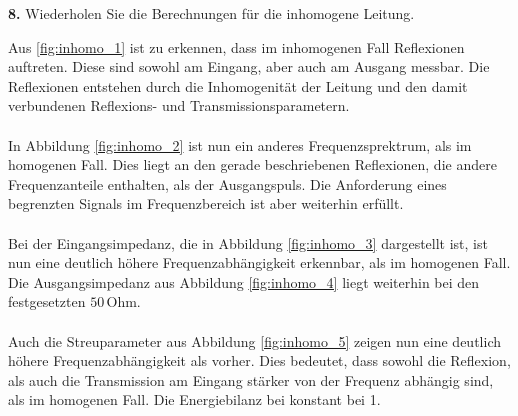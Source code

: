 \documentclass[Protokollheft.tex]{subfiles}
\begin{document}
\begin{framed}
	\noindent \textbf{8.} Wiederholen Sie die Berechnungen für die inhomogene Leitung.\label{exer:calc4inhomTLine}
\end{framed}
\noindent
Aus \ref{fig:inhomo_1} ist zu erkennen, dass im inhomogenen Fall Reflexionen auftreten. Diese sind sowohl am Eingang, aber auch am Ausgang messbar. Die Reflexionen entstehen durch die Inhomogenität der Leitung und den damit verbundenen Reflexions- und Transmissionsparametern.\\
\\
In Abbildung \ref{fig:inhomo_2} ist nun ein anderes Frequenzsprektrum, als im homogenen Fall. Dies liegt an den gerade beschriebenen Reflexionen, die andere Frequenzanteile enthalten, als der Ausgangspuls. Die Anforderung eines begrenzten Signals im Frequenzbereich ist aber weiterhin erfüllt.\\
\\
Bei der Eingangsimpedanz, die in Abbildung \ref{fig:inhomo_3} dargestellt ist, ist nun eine deutlich höhere Frequenzabhängigkeit erkennbar, als im homogenen Fall. Die Ausgangsimpedanz aus Abbildung \ref{fig:inhomo_4} liegt weiterhin bei den festgesetzten $50\,$Ohm.\\
\\
Auch die Streuparameter aus Abbildung \ref{fig:inhomo_5} zeigen nun eine deutlich höhere Frequenzabhängigkeit als vorher. Dies bedeutet, dass sowohl die Reflexion, als auch die Transmission am Eingang stärker von der Frequenz abhängig sind, als im homogenen Fall. Die Energiebilanz bei konstant bei 1.
\end{document}
